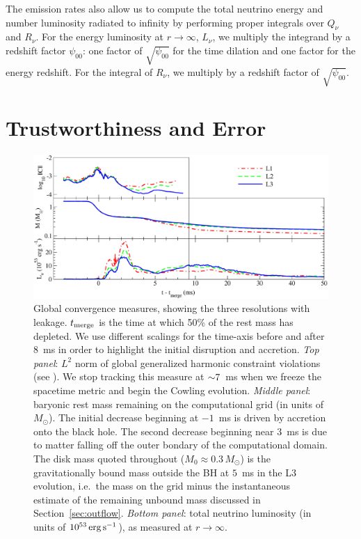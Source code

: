 The emission rates also allow us to compute the total neutrino energy
and number luminosity radiated to infinity by performing proper integrals
over $Q_{\nu}$ and $R_{\nu}$.  For the energy luminosity at $r\rightarrow\infty$, $L_{\nu}$,
we multiply the integrand by a redshift factor $\psi_{00}$:  one factor of
$\sqrt{\psi_{00}}$ for the time dilation and one factor for the energy redshift. 
For the integral of $R_{\nu}$, we multiply by a redshift factor of
$\sqrt{\psi_{00}}$.

\section{Trustworthiness and Error}
\label{sec:grhydroconvergence}

\begin{figure}
\centering
\includegraphics[width=16cm]{Figures/convergence_measures}
\caption[Global convergence measures]{
Global convergence measures,
showing the three resolutions with leakage.
$t_{\rm merge}$ is the time at which 50\% of the rest mass has depleted.
We use different scalings for the time-axis before and after 8~ms
in order to highlight the initial disruption and accretion.
{\em Top panel}: $L^2$ norm of global generalized harmonic constraint
violations (see \citealt{lind2007-gen_harmonic}). We stop tracking this measure at
$\mathord{\sim}7$~ms when we freeze the spacetime metric and begin the Cowling evolution.
{\em Middle panel}: baryonic rest mass remaining on the computational
grid (in units of $M_{\odot}$). The initial decrease beginning at $-1$~ms is
driven by accretion onto the black hole.
The second decrease beginning near $3$~ms is due to matter falling off the outer
bondary of the computational domain.
The disk mass quoted throughout ($M_0 \approx 0.3\,M_{\odot}$) is
the gravitationally bound mass outside the BH at $5$~ms in the L3 evolution,
i.e.\ the mass on the grid minus the instantaneous estimate of the remaining unbound mass
discussed in Section~\ref{sec:outflow}.
{\em Bottom panel}: total neutrino luminosity (in units of $10^{53}\rm\,erg\,s^{-1}$),
as measured at $r \rightarrow \infty$.
}
\label{fig:convergence}
\end{figure}


